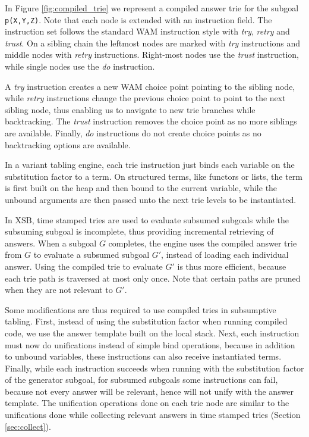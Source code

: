 In Figure \ref{fig:compiled_trie} we represent a compiled answer trie for the subgoal
\texttt{p(X,Y,Z)}. Note that each node is extended with an instruction field.
The instruction set follows the standard WAM instruction style with \textit{try},
\textit{retry} and \textit{trust}.
On a sibling chain the leftmost nodes are marked with \textit{try} instructions and middle
nodes with \textit{retry} instructions. Right-most nodes use the \textit{trust} instruction,
while single nodes use the \textit{do} instruction.

A \textit{try} instruction creates a new WAM choice point pointing to the sibling node,
while \textit{retry} instructions change the previous choice point to point to the next sibling node,
thus enabling us to navigate to new trie branches while backtracking. The \textit{trust}
instruction removes the choice point as no more siblings are available. Finally, \textit{do}
instructions do not create choice points as no backtracking options are available.

In a variant tabling engine, each trie instruction just binds each variable on the substitution factor to a term. On structured terms, like functors or lists, the term is first built on the heap and then
bound to the current variable, while the unbound arguments are then passed unto the next trie levels
to be instantiated.

In XSB, time stamped tries are used to evaluate subsumed subgoals while the subsuming subgoal
is incomplete, thus providing incremental retrieving of answers.
When a subgoal $G$ completes, the engine uses the compiled answer trie from $G$
to evaluate a subsumed subgoal $G'$, instead of loading each individual answer.
Using the compiled trie to evaluate $G'$ is thus more efficient, because
each trie path is traversed at most only once. Note that certain paths are pruned when they
are not relevant to $G'$.

Some modifications are thus required to use compiled tries in subsumptive tabling. First,
instead of using the substitution factor when running compiled code, we use the answer template built
on the local stack. Next, each instruction must now do unifications instead of simple bind operations,
because in addition to unbound variables, these instructions can also receive instantiated terms.
Finally, while each instruction succeeds when running with the substitution factor of the generator
subgoal, for subsumed subgoals some instructions can fail, because not every answer will be relevant,
hence will not unify with the answer template. The unification operations done on each trie node
are similar to the unifications done while collecting relevant answers in time stamped tries
(Section \ref{sec:collect}).

